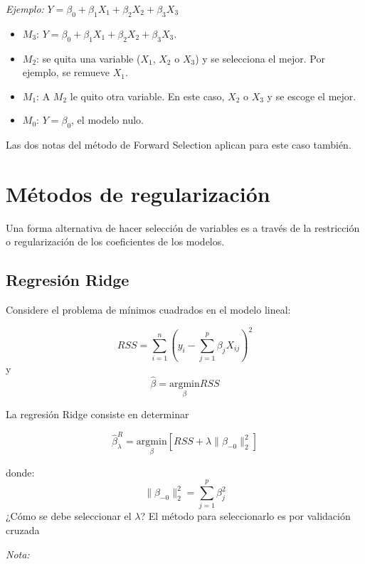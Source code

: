 \documentclass[
  12pt,
]{book}
\theoremstyle{definition}
\theoremstyle{definition}
\theoremstyle{definition}
\theoremstyle{definition}
\theoremstyle{remark}
\begin{document}
\emph{Ejemplo:} \(Y=\beta_0+\beta_1X_1+\beta_2X_2+\beta_3X_3\)

\begin{itemize}
\item
  \(M_3\): \(Y = \beta_0 +\beta_1X_1+\beta_2X_2+\beta_3X_3\).
\item
  \(M_2\): se quita una variable (\(X_1\), \(X_2\) o \(X_3\)) y se selecciona el mejor. Por ejemplo, se remueve \(X_1\).
\item
  \(M_1\): A \(M_{2}\) le quito otra variable. En este caso, \(X_2\) o \(X_3\) y se escoge el mejor.
\item
  \(M_0\): \(Y=\beta_0\), el modelo nulo.
\end{itemize}

Las dos notas del método de Forward Selection aplican para este caso también.

\hypertarget{muxe9todos-de-regularizaciuxf3n}{%
\section{Métodos de regularización}\label{muxe9todos-de-regularizaciuxf3n}}

Una forma alternativa de hacer selección de variables es a través de la restricción o regularización de los coeficientes de los modelos.

\hypertarget{regresiuxf3n-ridge}{%
\subsection{Regresión Ridge}\label{regresiuxf3n-ridge}}

Considere el problema de mínimos cuadrados en el modelo lineal:

\[ RSS = \sum_{i=1}^{n}\left(y_i-\sum_{j=1}^{p}\beta_jX_{ij}\right)^2 \]
y
\[
\hat\beta = \underset{\beta}{\mathrm{argmin}} RSS
\]

La regresión Ridge consiste en determinar

\[ \hat\beta^R_\lambda = \underset{\beta}{\mathrm{argmin}}\left[RSS + \lambda\|\beta_{-0}\|^2_2 \right]\]

donde:
\[\|\beta_{-0}\|^2_2 = \sum_{j=1}^{p}\beta_j^2\]
¿Cómo se debe seleccionar el \(\lambda\)?
El método para seleccionarlo es por validación cruzada

\emph{Nota:}
\end{document}
